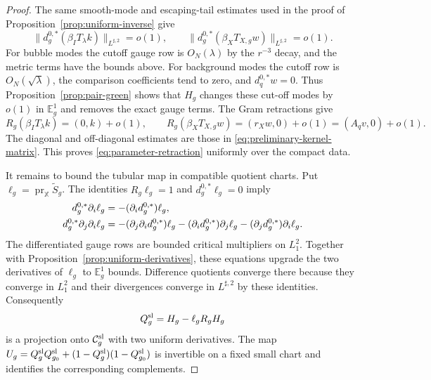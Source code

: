 \documentclass[11pt]{amsart}
\theoremstyle{definition}
\theoremstyle{remark}
\theoremstyle{plain}
\newcommand{\cC}{\mathcal{C}}
\begin{document}
\begin{proof}
The same smooth-mode and escaping-tail estimates used in the proof of
Proposition~\ref{prop:uniform-inverse} give
\begin{equation}\label{eq:critical-mode-divergences}
 \|d_g^{0,*}(\beta_IT_\lambda k)\|_{L^{\sharp,2}}=o(1),\qquad
 \|d_g^{0,*}(\beta_XT_{X,g}w)\|_{L^{\sharp,2}}=o(1).
\end{equation}
For bubble modes the cutoff gauge row is $O_N(\lambda)$ by the
$r^{-3}$ decay, and the metric terms have the bounds above.
For background modes the cutoff row is $O_N(\sqrt\lambda)$,
the comparison coefficients tend to zero, and $d_q^{0,*}w=0$.
Thus Proposition~\ref{prop:pair-green} shows that $H_g$ changes these
cut-off modes by $o(1)$ in $\mathbb E_g^1$ and removes the exact
gauge terms.  The Gram retractions give
\[
 R_g(\beta_IT_\lambda k)=(0,k)+o(1),\qquad
 R_g(\beta_XT_{X,g}w)=(r_Xw,0)+o(1)=(A_qv,0)+o(1).
\]
The diagonal and off-diagonal estimates are those in
\eqref{eq:preliminary-kernel-matrix}.  This proves
\eqref{eq:parameter-retraction} uniformly over the compact data.

It remains to bound the tubular map in compatible quotient charts.
Put $\ell_g=\operatorname{pr}_{\mathbb X}\widetilde S_g$.
The identities $R_g\ell_g=1$ and $d_g^{0,*}\ell_g=0$ imply
\begin{align}\label{eq:horizontal-kernel-derivatives}
 d_g^{0,*}\partial_i\ell_g
 &=-(\partial_i d_g^{0,*})\ell_g,\notag\\
 d_g^{0,*}\partial_j\partial_i\ell_g
 &=-(\partial_j\partial_i d_g^{0,*})\ell_g
   -(\partial_i d_g^{0,*})\partial_j\ell_g
   -(\partial_j d_g^{0,*})\partial_i\ell_g.
\end{align}
The differentiated gauge rows are bounded critical multipliers on
$L^2_1$.  Together with Proposition~\ref{prop:uniform-derivatives},
these equations upgrade the two derivatives of $\ell_g$ to
$\mathbb E_g^1$ bounds.  Difference quotients converge there because
they converge in $L^2_1$ and their divergences converge in
$L^{\sharp,2}$ by these identities.
Consequently
\begin{equation}\label{eq:horizontal-complement-projection}
 Q_g^{\rm sl}=H_g-\ell_gR_gH_g
\end{equation}
is a projection onto $\cC_g^{\rm sl}$ with two uniform derivatives.
The map
$U_g=Q_g^{\rm sl}Q_{g_0}^{\rm sl}+(1-Q_g^{\rm sl})(1-Q_{g_0}^{\rm sl})$ is invertible on a fixed small
chart and identifies the corresponding complements.


\end{proof}
\end{document}
